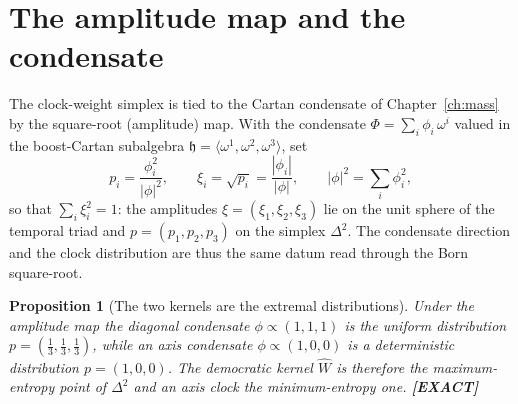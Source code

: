 \documentclass[11pt,oneside]{book}
\newcommand{\Wh}{\hat{W}}                         %
\newcommand{\status}[1]{{\sffamily\bfseries\color{statuscol}[#1]}}
\theoremstyle{plain}
\newtheorem{proposition}[theorem]{Proposition}
\theoremstyle{definition}
\theoremstyle{remark}
\begin{document}
\section{The amplitude map and the condensate}
\label{sec:amplitude}

The clock-weight simplex is tied to the Cartan condensate of
Chapter~\ref{ch:mass} by the square-root (amplitude) map. With the condensate
$\Phi=\sum_i\phi_i\,\omega^i$ valued in the boost-Cartan subalgebra
$\mathfrak h=\langle\omega^1,\omega^2,\omega^3\rangle$, set
\[
  p_i=\frac{\phi_i^2}{|\phi|^2},\qquad
  \xi_i=\sqrt{p_i}=\frac{|\phi_i|}{|\phi|},\qquad
  |\phi|^2=\sum_i\phi_i^2,
\]
so that $\sum_i\xi_i^2=1$: the amplitudes $\xi=(\xi_1,\xi_2,\xi_3)$ lie on the unit
sphere of the temporal triad and $p=(p_1,p_2,p_3)$ on the simplex $\Delta^2$. The
condensate direction and the clock distribution are thus the same datum read through
the Born square-root.

\begin{proposition}[The two kernels are the extremal distributions]
\label{prop:amplitude}
Under the amplitude map the diagonal condensate $\phi\propto(1,1,1)$ is the uniform
distribution $p=(\tfrac13,\tfrac13,\tfrac13)$, while an axis condensate
$\phi\propto(1,0,0)$ is a deterministic distribution $p=(1,0,0)$. The democratic
kernel $\Wh$ is therefore the maximum-entropy point of $\Delta^2$ and an axis clock
the minimum-entropy one. \status{EXACT}
\end{proposition}
\end{document}

